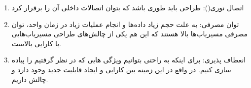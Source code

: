 \begin{qsolve}
\begin{enumerate}
		\item 
		اتصال نوری(): طراحی  باید طوری باشد که بتوان اتصالات داخلی آن را برقرار کرد
		
		\item 
		توان مصرفی: به علت حجم زیاد داده‌ها و انجام عملیات  زیاد در زمان واحد، توان مصرفی مسیریاب‌ها بالا هستند که این هم یکی از چالش‌های طراحی مسیریاب‌هایی با کارایی بالاست.
		
		
		\item 
		انعطاف پذیری: برای اینکه به راحتی بتوانیم ویژگی هایی که در نظر گرفتیم را پیاده سازی کنیم. در واقع در این زمینه بین کارایی و ایجاد قابلیت جدید  وجود دارد و چالش داریم. 
	
	\end{enumerate}
\end{qsolve}